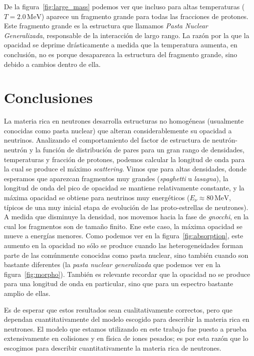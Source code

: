 De la figura~\ref{fig:large_mass} podemos ver que incluso para altas temperaturas ($T = 2.0\,\text{MeV}$) aparece un fragmento grande para todas las fracciones de protones.
Este fragmento grande es la estructura que llamamos \emph{Pasta Nuclear Generalizada}, responsable de la interacción de largo rango.
La razón por la que la opacidad se deprime drásticamente a medida que la temperatura aumenta, en conclusión, no es porque desaparezca la estructura del fragmento grande, sino debido a cambios dentro de ella.

\section{Conclusiones}\label{sc:conc}

La materia rica en neutrones desarrolla estructuras no homogéneas (usualmente conocidas como pasta nuclear) que alteran considerablemente su opacidad a neutrinos.
Analizando el comportamiento del factor de estructura de neutrón-neutrón y la función de distribución de pares para un gran rango de densidades, temperaturas y fracción de protones, podemos calcular la longitud de onda para la cual se produce el máximo \emph{scattering}.
Vimos que para altas densidades, donde esperamos que aparezcan fragmentos muy grandes (\emph{spaghetti} u \emph{lasagna}), la longitud de onda del pico de opacidad se mantiene relativamente constante, y la máxima opacidad se obtiene para neutrinos muy energéticos ($E_\nu \approx 80\,\text{MeV}$, típicos de una muy inicial etapa de evolución de las proto-estrellas de neutrones).
A medida que disminuye la densidad, nos movemos hacia la fase de \emph{gnocchi}, en la cual los fragmentos son de tamaño finito.
Ene este caso, la máxima opacidad se mueve a energías menores.
Como podemos ver en la figura~\ref{fig:absorption}, este aumento en la opacidad no sólo se produce cuando las heterogeneidades forman parte de las comúnmente conocidas como pasta nuclear, sino también cuando son bastante diferentes (la \emph{pasta nuclear generalizada} que podemos ver en la figura~\ref{fig:morpho}).
También es relevante recordar que la opacidad no se produce para una longitud de onda en particular, sino que para un espectro bastante amplio de ellas.

Es de esperar que estos resultados sean cualitativamente correctos, pero que dependan cuantitativamente del modelo escogido para describir la materia rica en neutrones.
El modelo que estamos utilizando en este trabajo fue puesto a prueba extensivamente en colisiones y en física de iones pesados; es por esta razón que lo escogimos para describir cuantitativamente la materia rica de neutrones.

